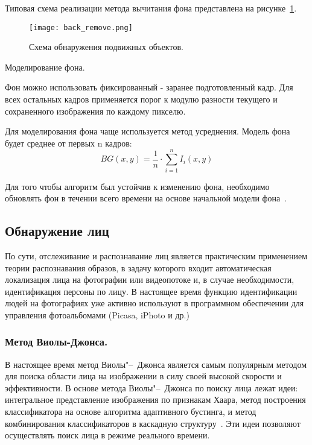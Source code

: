 Типовая схема реализации метода вычитания фона представлена на рисунке~\ref{fig:back_rem_scheme}.
\begin{figure}[ht]
\centering
    \centering
    \texttt{[image: back\_remove.png]}  
  \caption{Схема обнаружения подвижных объектов.}
  \label{fig:back_rem_scheme}
\end{figure}

Моделирование фона.

Фон можно использовать фиксированный - заранее подготовленный кадр. Для всех остальных кадров применяется порог к модулю разности текущего и сохраненного изображения по каждому пикселю.
 
Для моделирования фона чаще используется метод усреднения. Модель фона будет среднее от первых n кадров:
\begin{equation}
	BG\left(x,y\right) = \frac{1}{n}\cdot \sum_{i=1}^{n}I_i\left(x,y \right )
\end{equation}

Для того чтобы алгоритм был устойчив к изменению фона, необходимо обновлять фон в течении всего времени на основе начальной модели фона~\cite{fsdg_2010}.	

\subsection{Обнаружение лиц}
\label{sub:domain:face_detect}

По сути, отслеживание и распознавание лиц является практическим применением теории распознавания образов, в задачу которого входит автоматическая локализация лица на фотографии или видеопотоке и, в случае необходимости, идентификация персоны по лицу. В настоящее время функцию идентификации людей на фотографиях уже активно используют в программном обеспечении для управления фотоальбомами (Picasa, iPhoto и др.)~\cite{face_wiki}

\subsubsection{Метод Виолы-Джонса. }
\label{sub:domain:face_detect:viola_jones_method}
В настоящее время метод Виолы"--~Джонса является самым популярным методом для поиска области лица на изображении в силу своей высокой скорости и эффективности. В основе метода Виолы"--~Джонса по поиску лица лежат идеи: интегральное представление изображения по признакам Хаара, метод построения классификатора на основе алгоритма адаптивного бустинга, и метод комбинирования классификаторов в каскадную структуру~\cite{fd_2012}. Эти идеи позволяют осуществлять поиск лица в режиме реального времени.
	
